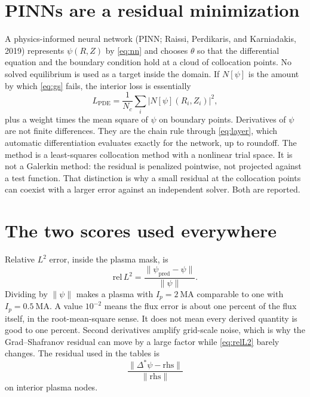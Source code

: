 \documentclass[11pt,a4paper,oneside,openany]{book}
\numberwithin{equation}{chapter}
\newcommand{\Dstar}{\Delta^{*}}
\newcommand{\Ip}{I_{p}}
\theoremstyle{definition}
\begin{document}
\section{PINNs are a residual minimization}

A physics-informed neural network (PINN; Raissi, Perdikaris, and Karniadakis, 2019) represents \(\psi(R,Z)\) by \eqref{eq:nn} and chooses \(\theta\) so that the differential equation and the boundary condition hold at a cloud of collocation points. No solved equilibrium is used as a target inside the domain. If \(N[\psi]\) is the amount by which \eqref{eq:gs} fails, the interior loss is essentially
\begin{equation}
\label{eq:pinn-loss}
L_{\mathrm{PDE}}
=\frac{1}{N_{c}}\sum_{i}\bigl\lvert N[\psi](R_{i},Z_{i})\bigr\rvert^{2},
\end{equation}
plus a weight times the mean square of \(\psi\) on boundary points. Derivatives of \(\psi\) are not finite differences. They are the chain rule through \eqref{eq:layer}, which automatic differentiation evaluates exactly for the network, up to roundoff. The method is a least-squares collocation method with a nonlinear trial space. It is not a Galerkin method: the residual is penalized pointwise, not projected against a test function. That distinction is why a small residual at the collocation points can coexist with a larger error against an independent solver. Both are reported.

\section{The two scores used everywhere}

Relative \(L^{2}\) error, inside the plasma mask, is
\begin{equation}
\label{eq:relL2}
\mathrm{rel}\,L^{2}
=\frac{\lVert\psi_{\mathrm{pred}}-\psi\rVert}{\lVert\psi\rVert}.
\end{equation}
Dividing by \(\lVert\psi\rVert\) makes a plasma with \(\Ip=\qty{2}{\mega\ampere}\) comparable to one with \(\Ip=\qty{0.5}{\mega\ampere}\). A value \(10^{-2}\) means the flux error is about one percent of the flux itself, in the root-mean-square sense. It does not mean every derived quantity is good to one percent. Second derivatives amplify grid-scale noise, which is why the Grad--Shafranov residual can move by a large factor while \eqref{eq:relL2} barely changes. The residual used in the tables is
\begin{equation}
\label{eq:gsres}
\frac{\lVert\Dstar\psi-\mathrm{rhs}\rVert}{\lVert\mathrm{rhs}\rVert}
\end{equation}
on interior plasma nodes.
\end{document}
